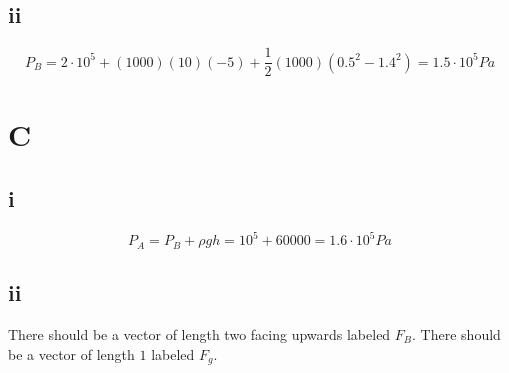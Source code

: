 \documentclass{article}
\begin{document}
\subsection{ii}

$$P_B = 2\cdot 10^5 + (1000)(10)(-5) + \frac{1}{2}(1000)(0.5^2-1.4^2) = 1.5\cdot 10^5 Pa$$

\section{C}

\subsection{i}

$$P_A = P_B + \rho gh = 10^5 + 60000 = 1.6 \cdot 10^5 Pa$$

\subsection{ii}

There should be a vector of length two facing upwards labeled $F_B$. There should be a vector of length $1$ labeled $F_g$.
\end{document}
